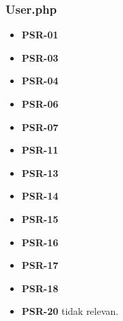 \subsubsection{User.php}
\begin{itemize}
	\item \textbf{PSR-01} 
	\item \textbf{PSR-03}
	\item \textbf{PSR-04}
	\item \textbf{PSR-06}
	\item \textbf{PSR-07}
	\item \textbf{PSR-11}
	\item \textbf{PSR-13}
	\item \textbf{PSR-14}
	\item \textbf{PSR-15}
	\item \textbf{PSR-16}
	\item \textbf{PSR-17} 
	\item \textbf{PSR-18} 
	\item \textbf{PSR-20} tidak relevan.
\end{itemize}